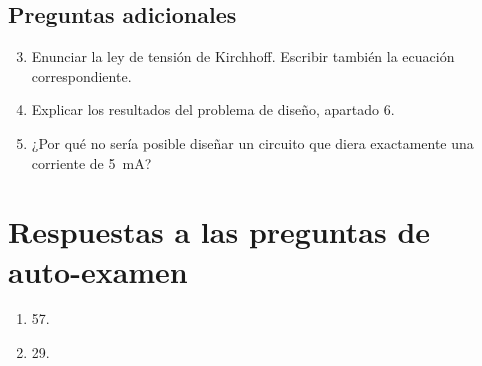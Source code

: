 \documentclass{article}
\begin{document}
\subsection{Preguntas adicionales}
\begin{enumerate}
    \setcounter{enumi}{2} %
    \item Enunciar la ley de tensión de Kirchhoff. Escribir también la ecuación correspondiente.
    
    \item Explicar los resultados del problema de diseño, apartado 6.
    
    \item ¿Por qué no sería posible diseñar un circuito que diera exactamente una corriente de \SI{5}{mA}?
\end{enumerate}

\section{Respuestas a las preguntas de auto-examen}
\begin{enumerate}
    \item 57.
    \item 29.
\end{enumerate}
\end{document}
